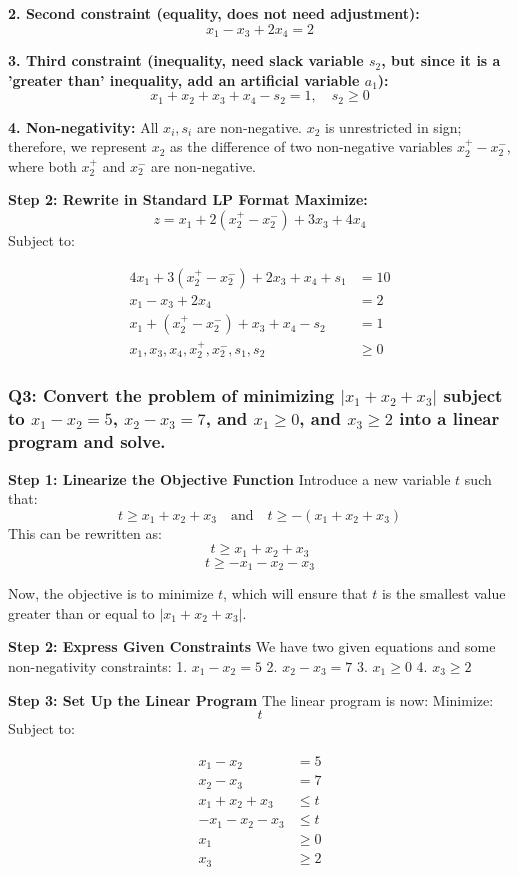 \documentclass[8pt]{article}
\begin{document}
\textbf{2. Second constraint (equality, does not need adjustment):}
   \[
   x_1 - x_3 + 2x_4 = 2
   \]

\textbf{3. Third constraint (inequality, need slack variable \(s_2\), but since it is a 'greater than' inequality, add an artificial variable \(a_1\)):}
   \[
   x_1 + x_2 + x_3 + x_4 - s_2 = 1, \quad s_2 \geq 0
   \]

\textbf{4. Non-negativity:}
   All \(x_i, s_i\) are non-negative. \(x_2\) is unrestricted in sign; therefore, we represent \(x_2\) as the difference of two non-negative variables \(x_2^+ - x_2^- \), where both \(x_2^+\) and \(x_2^-\) are non-negative.

\textbf{Step 2: Rewrite in Standard LP Format
Maximize:}
\[
z = x_1 + 2(x_2^+ - x_2^-) + 3x_3 + 4x_4
\]
Subject to:

\begin{align*}
4x_1 + 3(x_2^+ - x_2^-) + 2x_3 + x_4 + s_1 &= 10 \\
x_1 - x_3 + 2x_4 &= 2 \\
x_1 + (x_2^+ - x_2^-) + x_3 + x_4 - s_2 &= 1 \\
x_1, x_3, x_4, x_2^+, x_2^-, s_1, s_2 &\geq 0
\end{align*}


\subsubsection*{Q3: Convert the problem of minimizing \(|x_1 + x_2 + x_3|\) subject to \(x_1 - x_2 = 5\), \(x_2 - x_3 = 7\), and \(x_1 \geq 0\), and \(x_3 \geq 2\) into a linear program and solve.}

\textbf{Step 1: Linearize the Objective Function}
Introduce a new variable \( t \) such that:
\[
t \geq x_1 + x_2 + x_3 \quad \text{and} \quad t \geq -(x_1 + x_2 + x_3)
\]
This can be rewritten as:
\[
t \geq x_1 + x_2 + x_3
\]
\[
t \geq -x_1 - x_2 - x_3
\]

Now, the objective is to minimize \( t \), which will ensure that \( t \) is the smallest value greater than or equal to \( |x_1 + x_2 + x_3| \).

\textbf{Step 2: Express Given Constraints}
We have two given equations and some non-negativity constraints:
1. \( x_1 - x_2 = 5 \)
2. \( x_2 - x_3 = 7 \)
3. \( x_1 \geq 0 \)
4. \( x_3 \geq 2 \)

\textbf{Step 3: Set Up the Linear Program}
The linear program is now:
Minimize:
\[
t
\]
Subject to:

\begin{align*}
x_1 - x_2 &= 5 \\
x_2 - x_3 &= 7 \\
x_1 + x_2 + x_3 &\leq t \\
-x_1 - x_2 - x_3 &\leq t \\
x_1 &\geq 0 \\
x_3 &\geq 2
\end{align*}
\end{document}
